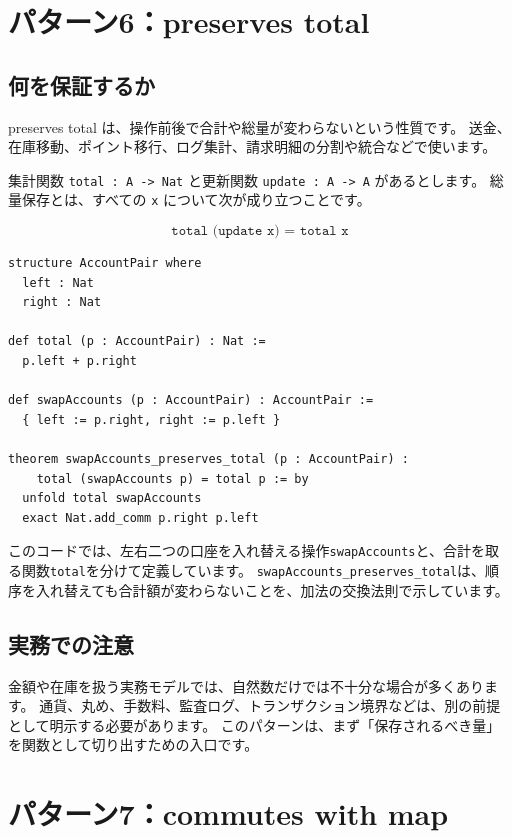 \section{パターン6：preserves total}

\subsection{何を保証するか}

preserves total は、操作前後で合計や総量が変わらないという性質です。
送金、在庫移動、ポイント移行、ログ集計、請求明細の分割や統合などで使います。

集計関数 \texttt{total : A -> Nat} と更新関数 \texttt{update : A -> A} があるとします。
総量保存とは、すべての \texttt{x} について次が成り立つことです。

\[
\texttt{total (update x) = total x}
\]

\begin{listing}[htbp]
\begin{verbatim}
structure AccountPair where
  left : Nat
  right : Nat

def total (p : AccountPair) : Nat :=
  p.left + p.right

def swapAccounts (p : AccountPair) : AccountPair :=
  { left := p.right, right := p.left }

theorem swapAccounts_preserves_total (p : AccountPair) :
    total (swapAccounts p) = total p := by
  unfold total swapAccounts
  exact Nat.add_comm p.right p.left
\end{verbatim}
\caption{\texttt{swapAccounts\_preserves\_total}}
\label{lst:appc_preserves_total}
\end{listing}

このコードでは、左右二つの口座を入れ替える操作\texttt{swapAccounts}と、合計を取る関数\texttt{total}を分けて定義しています。
\texttt{swapAccounts\_preserves\_total}は、順序を入れ替えても合計額が変わらないことを、加法の交換法則で示しています。

\subsection{実務での注意}

金額や在庫を扱う実務モデルでは、自然数だけでは不十分な場合が多くあります。
通貨、丸め、手数料、監査ログ、トランザクション境界などは、別の前提として明示する必要があります。
このパターンは、まず「保存されるべき量」を関数として切り出すための入口です。

\section{パターン7：commutes with map}

